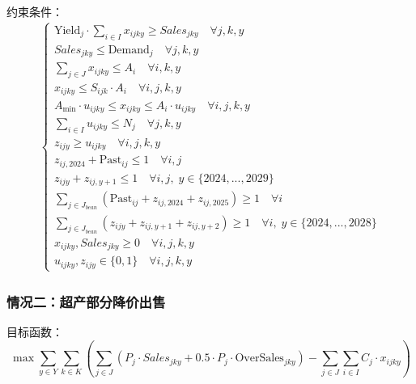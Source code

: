 \documentclass[withoutpreface,bwprint]{cumcmthesis} %
\begin{document}
约束条件：
\begin{align}
	\left\{
	\begin{array}{l}
		\text{Yield}_j \cdot \sum_{i \in I} x_{ijky} \ge Sales_{jky} \quad \forall j,k,y                            \\
		Sales_{jky} \le \text{Demand}_j \quad \forall j,k,y                                                         \\
		\sum_{j \in J} x_{ijky} \le A_i \quad \forall i,k,y                                                         \\
		x_{ijky} \le S_{ijk} \cdot A_i \quad \forall i,j,k,y                                                        \\
		A_{\min} \cdot u_{ijky} \le x_{ijky} \le A_i \cdot u_{ijky} \quad \forall i,j,k,y                           \\
		\sum_{i \in I} u_{ijky} \le N_j \quad \forall j,k,y                                                         \\
		z_{ijy} \ge u_{ijky} \quad \forall i,j,k,y                                                                  \\
		z_{ij,2024} + \text{Past}_{ij} \le 1 \quad \forall i,j                                                      \\
		z_{ijy} + z_{ij,y+1} \le 1 \quad \forall i,j, \; y \in \{2024,...,2029\}                                    \\
		\sum_{j \in J_{bean}} (\text{Past}_{ij} + z_{ij,2024} + z_{ij,2025}) \ge 1 \quad \forall i                  \\
		\sum_{j \in J_{bean}} (z_{ijy} + z_{ij,y+1} + z_{ij,y+2}) \ge 1 \quad \forall i, \; y \in \{2024,...,2028\} \\
		x_{ijky}, Sales_{jky} \ge 0 \quad \forall i,j,k,y                                                           \\
		u_{ijky}, z_{ijy} \in \{0, 1\} \quad \forall i,j,k,y
	\end{array}
	\right.
\end{align}

\subsubsection{情况二：超产部分降价出售}

目标函数：
\begin{equation}
	\max \sum_{y \in Y} \sum_{k \in K} \left( \sum_{j \in J} (P_j \cdot Sales_{jky} + 0.5 \cdot P_j \cdot \text{OverSales}_{jky}) - \sum_{j \in J} \sum_{i \in I} C_j \cdot x_{ijky} \right)
\end{equation}
\end{document}
